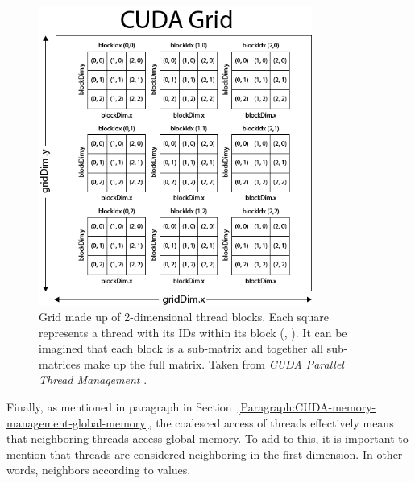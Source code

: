 \begin{figure}[h!]
	\centering
	\includegraphics[width=0.8\textwidth, keepaspectratio]{images/ch1/CUDA-GridBlockThread-Structure.png}
	\caption{Grid made up of 2-dimensional thread blocks. Each square represents a thread with its IDs within its block (, ). It can be imagined that each block is a sub-matrix and together all sub-matrices make up the full matrix. Taken from \emph{CUDA Parallel Thread Management} \cite{McKennon13June2013}.}
	\label{Figure:CUDA-GridBlockThread-Structure}
\end{figure}

Finally, as mentioned in paragraph \textit{} in Section~\ref{Paragraph:CUDA-memory-management-global-memory}, the coalesced access of threads effectively means that neighboring threads access global memory. To add to this, it is important to mention that threads are considered neighboring in the first dimension. In other words, neighbors according to  values.

